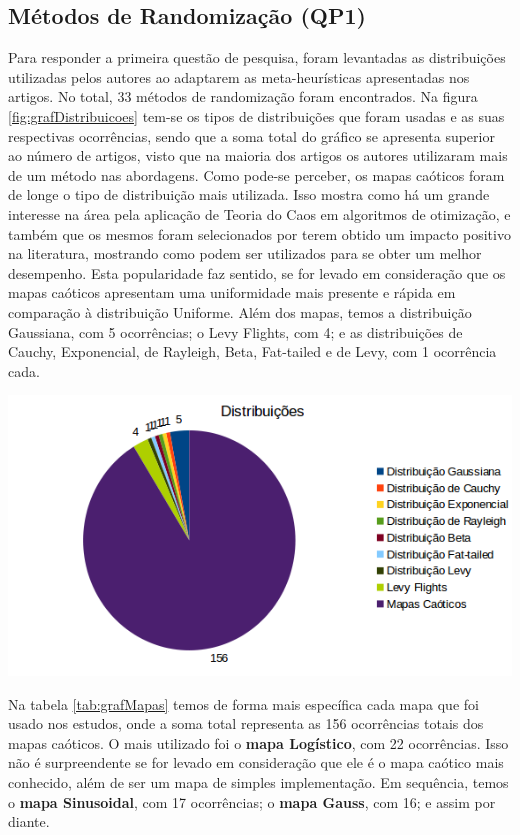 \subsection{Métodos de Randomização (QP1)}

Para responder a primeira questão de pesquisa, foram levantadas as distribuições utilizadas pelos autores ao adaptarem as meta-heurísticas apresentadas nos artigos. No total, 33 métodos de randomização foram encontrados. Na figura \ref{fig:grafDistribuicoes} tem-se os tipos de distribuições que foram usadas e as suas respectivas ocorrências, sendo que a soma total do gráfico se apresenta superior ao número de artigos, visto que na maioria dos artigos os autores utilizaram mais de um método nas abordagens. Como pode-se perceber, os mapas caóticos foram de longe o tipo de distribuição mais utilizada. Isso mostra como há um grande interesse na área pela aplicação de Teoria do Caos em algoritmos de otimização, e também que os mesmos foram selecionados por terem obtido um impacto positivo na literatura, mostrando como podem ser utilizados para se obter um melhor desempenho. Esta popularidade faz sentido, se for levado em consideração que os mapas caóticos apresentam uma uniformidade mais presente e rápida em comparação à distribuição Uniforme. Além dos mapas, temos a distribuição Gaussiana, com 5 ocorrências; o Levy Flights, com 4; e as distribuições de Cauchy, Exponencial, de Rayleigh, Beta, Fat-tailed e de Levy, com 1 ocorrência cada.

{
    \centering
    \includegraphics[width=0.7\linewidth]{figuras/graficoDistribuicoes.png}
    \label{fig:grafDistribuicoes}
}

Na tabela \ref{tab:grafMapas} temos de forma mais específica cada mapa que foi usado nos estudos, onde a soma total representa as 156 ocorrências totais dos mapas caóticos. O mais utilizado foi o \textbf{mapa Logístico}, com 22 ocorrências. Isso não é surpreendente se for levado em consideração que ele é o mapa caótico mais conhecido, além de ser um mapa de simples implementação. Em sequência, temos o \textbf{mapa Sinusoidal}, com 17 ocorrências; o \textbf{mapa Gauss}, com 16; e assim por diante. 

